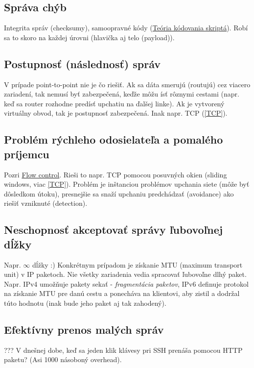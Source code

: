 \documentclass[10pt,a4paper]{article}
\begin{document}
\subsection{Správa chýb}
Integrita správ (checksumy), samoopravné kódy (\href{http://www.dcs.fmph.uniba.sk/texty/codebook.pdf}{Teória kódovania skriptá}). 
Robí sa to skoro na každej úrovni (hlavička aj telo (payload)).
                  
\subsection{Postupnosť (následnosť) správ}
V prípade point-to-point nie je čo riešiť. Ak sa dáta smerujú (routujú) cez viacero zariadení, tak nemusí byť zabezpečená, keďže môžu ísť rôznymi cestami (napr. keď sa router rozhodne predísť upchatiu na ďalšej linke). 
Ak je vytvorený virtuálny obvod, tak je postupnosť zabezpečená. Inak napr. TCP (\ref{TCP}).
 
\subsection{Problém rýchleho odosielateľa a pomalého príjemcu}
Pozri \href{http://en.wikipedia.org/wiki/Flow\_control}{Flow control}.
Rieši to napr. TCP pomocou posuvných okien (sliding windows, viac \ref{TCP}).
Problém je inštanciou problémov upchania siete (môže byť dôsledkom útoku),
presnejšie sa snaží upchaniu predchádzať (avoidance) ako riešiť vzniknuté (detection).
  
\subsection{Neschopnosť akceptovať správy ľubovoľnej dĺžky}  
Napr. $\infty$ dĺžky :)
Konkrétnym prípadom je získanie MTU (maximum transport unit) v IP paketoch. 
Nie všetky zariadenia vedia spracovať ľubovoľne dlhý paket. Napr. IPv4 umožňuje pakety sekať - \emph{fragmentácia paketov}, IPv6 definuje protokol na získanie MTU pre danú cestu a ponecháva na klientovi, aby zistil a dodržal túto hodnotu (inak bude jeho paket aj tak zahodený).

\subsection{Efektívny prenos malých správ} 
???
V dnešnej dobe, keď sa jeden klik klávesy pri SSH prenáša pomocou HTTP paketu?
(Asi 1000 násoboný overhead).
      
\end{document}
